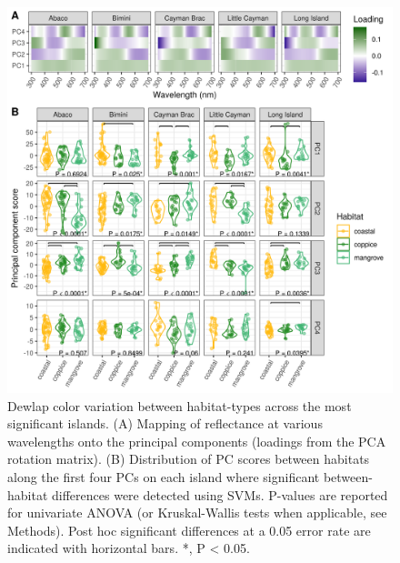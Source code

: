 \begin{figure}
	\centering
	\includegraphics[width=\textwidth]{../analyses/07-ANOVA/figure_anova.png}
	\caption{Dewlap color variation between habitat-types across the most significant islands. (A) Mapping of reflectance at various wavelengths onto the principal components (loadings from the PCA rotation matrix). (B) Distribution of PC scores between habitats along the first four PCs on each island where significant between-habitat differences were detected using SVMs. P-values are reported for univariate ANOVA (or Kruskal-Wallis tests when applicable, see Methods). Post hoc significant differences at a 0.05 error rate are indicated with horizontal bars. *, P < 0.05.}
	\label{fig:anova}
\end{figure}

